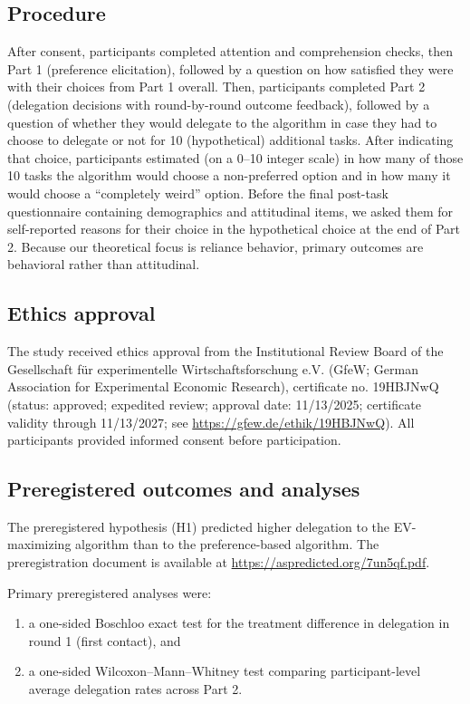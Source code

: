 \documentclass[a4paper, 12pt, fleqn]{article}
\theoremstyle{definition}
\begin{document}
\subsection{Procedure}
After consent, participants completed attention and comprehension checks, then Part 1 (preference elicitation), followed by a question on how satisfied they were with their choices from Part 1 overall. Then, participants completed Part 2 (delegation decisions with round-by-round outcome feedback), followed by a question of whether they would delegate to the algorithm in case they had to choose to delegate or not for 10 (hypothetical) additional tasks. After indicating that choice, participants estimated (on a 0--10 integer scale) in how many of those 10 tasks the algorithm would choose a non-preferred option and in how many it would choose a ``completely weird'' option. Before the final post-task questionnaire containing demographics and attitudinal items, we asked them for self-reported reasons for their choice in the hypothetical choice at the end of Part 2. Because our theoretical focus is reliance behavior, primary outcomes are behavioral rather than attitudinal.

\subsection{Ethics approval}
The study received ethics approval from the Institutional Review Board of the Gesellschaft für experimentelle Wirtschaftsforschung e.V. (GfeW; German Association for Experimental Economic Research), certificate no. 19HBJNwQ (status: approved; expedited review; approval date: 11/13/2025; certificate validity through 11/13/2027; see {\footnotesize\url{https://gfew.de/ethik/19HBJNwQ}}). All participants provided informed consent before participation.

\subsection{Preregistered outcomes and analyses}
The preregistered hypothesis (H1) predicted higher delegation to the EV-maximizing algorithm than to the preference-based algorithm.
The preregistration document is available at {\footnotesize\url{https://aspredicted.org/7un5qf.pdf}}.

Primary preregistered analyses were:
\begin{enumerate}
  \item a one-sided Boschloo exact test for the treatment difference in delegation in round 1 (first contact), and
  \item a one-sided Wilcoxon--Mann--Whitney test comparing participant-level average delegation rates across Part 2.
\end{enumerate}
\end{document}
